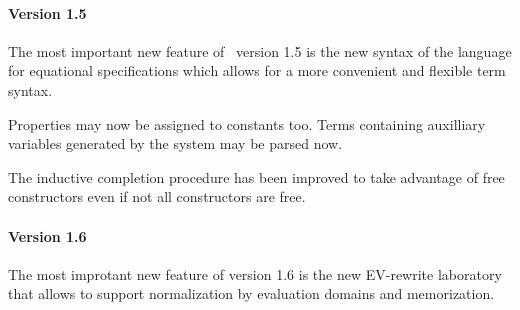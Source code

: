 \paragraph{Version 1.5}
The most important new feature of \redux\ version 1.5 is the new syntax of the
language for equational specifications which allows for a more
convenient and flexible term syntax.

Properties may now be assigned to constants too. Terms containing
auxilliary variables generated by the system may be parsed now.

The inductive completion procedure has been improved to take advantage
of free constructors even if not all constructors are free.

\paragraph{Version 1.6}
The most improtant new feature of version 1.6 is the new EV-rewrite
laboratory that allows to support normalization by evaluation domains
and memorization.


